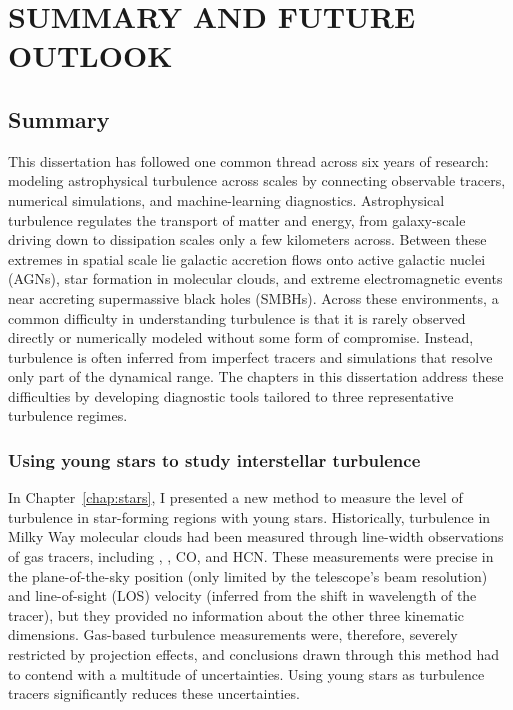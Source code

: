 \chapter{\texorpdfstring{\MakeUppercase{Summary and Future Outlook}}{Summary and Future Outlook}} \label{chap:summary}

\section{Summary}

This dissertation has followed one common thread across six years of research: modeling astrophysical turbulence across scales by connecting observable tracers, numerical simulations, and machine-learning diagnostics.
Astrophysical turbulence regulates the transport of matter and energy, from galaxy-scale driving down to dissipation scales only a few kilometers across.
Between these extremes in spatial scale lie galactic accretion flows onto active galactic nuclei (AGNs), star formation in molecular clouds, and extreme electromagnetic events near accreting supermassive black holes (SMBHs).
Across these environments, a common difficulty in understanding turbulence is that it is rarely observed directly or numerically modeled without some form of compromise.
Instead, turbulence is often inferred from imperfect tracers and simulations that resolve only part of the dynamical range.
The chapters in this dissertation address these difficulties by developing diagnostic tools tailored to three representative turbulence regimes.

\subsection{Using young stars to study interstellar turbulence}

In Chapter~\ref{chap:stars}, I presented a new method to measure the level of turbulence in star-forming regions with young stars.
Historically, turbulence in Milky Way molecular clouds had been measured through line-width observations of gas tracers, including \halpha, , CO, and HCN\@.
These measurements were precise in the plane-of-the-sky position (only limited by the telescope's beam resolution) and line-of-sight (LOS) velocity (inferred from the shift in wavelength of the tracer), but they provided no information about the other three kinematic dimensions.
Gas-based turbulence measurements were, therefore, severely restricted by projection effects, and conclusions drawn through this method had to contend with a multitude of uncertainties.
Using young stars as turbulence tracers significantly reduces these uncertainties.

